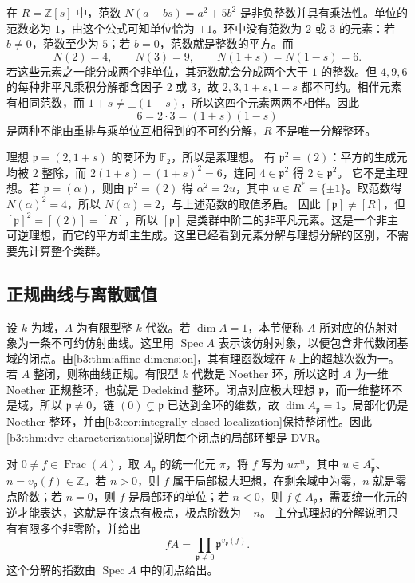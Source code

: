 \ProseParagraphBreak
在 \(R=\mathbb Z[s]\) 中，范数 \(N(a+bs)=a^2+5b^2\) 是非负整数并具有乘法性。单位的范数必为 \(1\)，由这个公式可知单位恰为 \(\pm1\)。环中没有范数为 \(2\) 或 \(3\) 的元素：若 \(b\ne0\)，范数至少为 \(5\)；若 \(b=0\)，范数就是整数的平方。而
\[
	N(2)=4,\qquad N(3)=9,\qquad N(1+s)=N(1-s)=6.
\]
若这些元素之一能分成两个非单位，其范数就会分成两个大于 \(1\) 的整数。但 \(4,9,6\) 的每种非平凡乘积分解都含因子 \(2\) 或 \(3\)，故 \(2,3,1+s,1-s\) 都不可约。相伴元素有相同范数，而 \(1+s\ne\pm(1-s)\)，所以这四个元素两两不相伴。因此
\[
	6=2\cdot3=(1+s)(1-s)
\]
是两种不能由重排与乘单位互相得到的不可约分解，\(R\) 不是唯一分解整环。

\ProseParagraphBreak
理想 \(\mathfrak p=(2,1+s)\) 的商环为 \(\mathbb F_2\)，所以是素理想。 有 \(\mathfrak p^2=(2)\)：平方的生成元均被 \(2\) 整除，而 \(2(1+s)-(1+s)^2=6\)，连同 \(4\in\mathfrak p^2\) 得 \(2\in\mathfrak p^2\)。 它不是主理想。若 \(\mathfrak p=(\alpha)\)，则由 \(\mathfrak p^2=(2)\) 得 \(\alpha^2=2u\)，其中 \(u\in R^*=\{\pm1\}\)。取范数得 \(N(\alpha)^2=4\)，所以 \(N(\alpha)=2\)，与上述范数的取值矛盾。 因此 \([\mathfrak p]\ne[R]\)，但 \([\mathfrak p]^2=[(2)]=[R]\)，所以 \([\mathfrak p]\) 是类群中阶二的非平凡元素。这是一个非主可逆理想，而它的平方却主生成。这里已经看到元素分解与理想分解的区别，不需要先计算整个类群。

\subsection{正规曲线与离散赋值}
\label{b3:subsec:1004:03}

设 \(k\) 为域，\(A\) 为有限型整 \(k\) 代数。若 \(\dim A=1\)，本节便称 \(A\) 所对应的仿射对象为一条不可约仿射曲线。这里用 \(\operatorname{Spec}A\) 表示该仿射对象，以便包含非代数闭基域的闭点。由\cref{b3:thm:affine-dimension}，其有理函数域在 \(k\) 上的超越次数为一。 若 \(A\) 整闭，则称曲线正规。有限型 \(k\) 代数是 Noether 环，所以这时 \(A\) 为一维 Noether 正规整环，也就是 Dedekind 整环。闭点对应极大理想 \(\mathfrak p\)，而一维整环不是域，所以 \(\mathfrak p\ne0\)，链 \((0)\subsetneq\mathfrak p\) 已达到全环的维数，故 \(\dim A_{\mathfrak p}=1\)。局部化仍是 Noether 整环，并由\cref{b3:cor:integrally-closed-localization}保持整闭性。因此\cref{b3:thm:dvr-characterizations}说明每个闭点的局部环都是 DVR。

\ProseParagraphBreak
对 \(0\ne f\in\operatorname{Frac}(A)\)，取 \(A_{\mathfrak p}\) 的统一化元 \(\pi\)，将 \(f\) 写为 \(u\pi^n\)，其中 \(u\in A_{\mathfrak p}^*\)、\(n=v_{\mathfrak p}(f)\in\mathbb Z\)。若 \(n>0\)，则 \(f\) 属于局部极大理想，在剩余域中为零，\(n\) 就是零点阶数；若 \(n=0\)，则 \(f\) 是局部环的单位；若 \(n<0\)，则 \(f\notin A_{\mathfrak p}\)，需要统一化元的逆才能表达，这就是在该点有极点，极点阶数为 \(-n\)。 主分式理想的分解说明只有有限多个非零阶，并给出
\[
	fA=\prod_{\mathfrak p\ne0}\mathfrak p^{v_{\mathfrak p}(f)}.
\]
这个分解的指数由 \(\operatorname{Spec}A\) 中的闭点给出。

